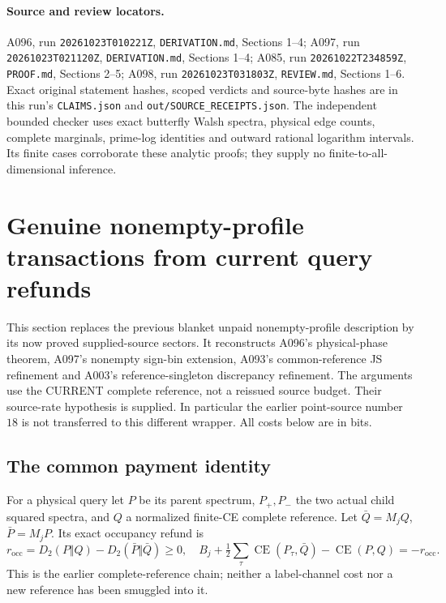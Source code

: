 \documentclass[11pt]{article}
\newcommand{\KL}{D_2}
\newcommand{\CE}{\operatorname{CE}}
\begin{document}
\paragraph{Source and review locators.}
A096, run \texttt{20261023T010221Z}, \texttt{DERIVATION.md}, Sections 1--4;
A097, run \texttt{20261023T021120Z}, \texttt{DERIVATION.md}, Sections 1--4;
A085, run \texttt{20261022T234859Z}, \texttt{PROOF.md}, Sections 2--5;
A098, run \texttt{20261023T031803Z}, \texttt{REVIEW.md}, Sections 1--6.
Exact original statement hashes, scoped verdicts and source-byte hashes
are in this run's \texttt{CLAIMS.json} and \texttt{out/SOURCE\_RECEIPTS.json}.
The independent bounded checker uses exact butterfly Walsh spectra,
physical edge counts, complete marginals, prime-log identities and
outward rational logarithm intervals. Its finite cases corroborate
these analytic proofs; they supply no finite-to-all-dimensional inference.

\section{Genuine nonempty-profile transactions from current query refunds}
\label{sec:phase9}
This section replaces the previous blanket unpaid nonempty-profile
description by its now proved supplied-source sectors. It reconstructs
A096's physical-phase theorem, A097's nonempty sign-bin extension,
A093's common-reference JS refinement and A003's reference-singleton
discrepancy refinement. The arguments use the CURRENT complete reference,
not a reissued source budget. Their source-rate hypothesis is supplied.
In particular the earlier point-source number $18$ is not transferred
to this different wrapper. All costs below are in bits.

\subsection{The common payment identity}
\label{sec:centroid9}
For a physical query let $P$ be its parent spectrum, $P_+,P_-$ the
two actual child squared spectra, and $Q$ a normalized finite-CE
complete reference. Let $\bar Q=M_jQ$, $\bar P=M_jP$.
Its exact occupancy refund is
\[
r_{\mathrm{occ}}=\KL(P\Vert Q)-\KL(\bar P\Vert\bar Q)\ge0,
\quad
B_j+\tfrac12\sum_\tau\CE(P_\tau,\bar Q)-\CE(P,Q)
=-r_{\mathrm{occ}}.
\]
This is the earlier complete-reference chain; neither a label-channel
cost nor a new reference has been smuggled into it.
\end{document}
